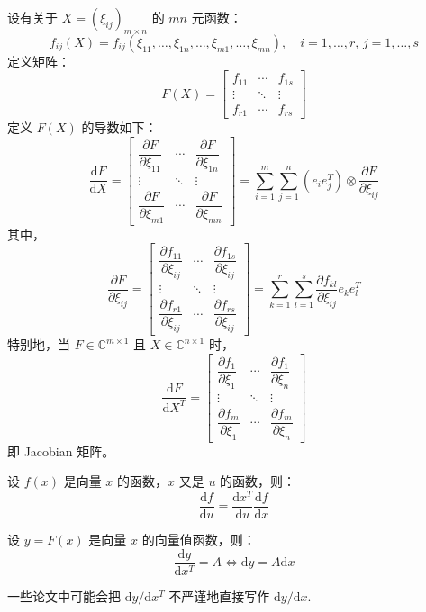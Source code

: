 \begin{definition}[矩阵函数对矩阵的导数]
设有关于 $X=(\xi_{ij})_{m\times n}$ 的 $mn$ 元函数：
\[
    f_{ij}(X)=f_{ij}(\xi_{11},\ldots,\xi_{1n},\ldots,\xi_{m1},\ldots,\xi_{mn}),\quad i=1,\ldots,r,\,j=1,\ldots,s
\]
定义矩阵：
\[
    F(X)=\begin{bmatrix}f_{11}&\cdots&f_{1s}\\\vdots&\ddots&\vdots\\f_{r1}&\cdots&f_{rs}\end{bmatrix}
\]
定义 $F(X)$ 的导数如下：
\[
    \frac{\mathrm dF}{\mathrm dX}=
    \begin{bmatrix}
    \dfrac{\partial F}{\partial \xi_{11}}&\cdots&\dfrac{\partial F}{\partial \xi_{1n}}\\
    \vdots&\ddots&\vdots\\
    \dfrac{\partial F}{\partial \xi_{m1}}&\cdots&\dfrac{\partial F}{\partial \xi_{mn}}
    \end{bmatrix}=\sum_{i=1}^m\sum_{j=1}^n(e_ie_j^T)\otimes\frac{\partial F}{\partial \xi_{ij}}
\]
其中，
\[
    \frac{\partial F}{\partial \xi_{ij}}=
    \begin{bmatrix}
    \dfrac{\partial f_{11}}{\partial \xi_{ij}}&\cdots&\dfrac{\partial f_{1s}}{\partial \xi_{ij}}\\
    \vdots&\ddots&\vdots\\
    \dfrac{\partial f_{r1}}{\partial \xi_{ij}}&\cdots&\dfrac{\partial f_{rs}}{\partial \xi_{ij}}
    \end{bmatrix}=\sum_{k=1}^r\sum_{l=1}^s\frac{\partial f_{kl}}{\partial \xi_{ij}}e_ke_l^T
\]
特别地，当 $F\in\mathbb C^{m\times 1}$ 且 $X\in\mathbb C^{n\times 1}$ 时，
\[
    \frac{\mathrm dF}{\mathrm dX^T}=
    \begin{bmatrix}
    \dfrac{\partial f_{1}}{\partial \xi_{1}}&\cdots&\dfrac{\partial f_{1}}{\partial \xi_{n}}\\
    \vdots&\ddots&\vdots\\
    \dfrac{\partial f_{m}}{\partial \xi_{1}}&\cdots&\dfrac{\partial f_{m}}{\partial \xi_{n}}
    \end{bmatrix}
\]
即 Jacobian 矩阵。
\end{definition}

\begin{property}[链式法则]
设 $f(x)$ 是向量 $x$ 的函数，$x$ 又是 $u$ 的函数，则：
\[
    \frac{\mathrm df}{\mathrm du}=\frac{\mathrm dx^T}{\mathrm du}\frac{\mathrm df}{\mathrm dx}
\]
\end{property}

\begin{theorem}[向量函数关于向量导数的微分形式]
设 $y=F(x)$ 是向量 $x$ 的向量值函数，则：
\[
    \frac{\mathrm dy}{\mathrm dx^T}=A\iff\mathrm dy=A\mathrm dx
\]
\end{theorem}
\begin{note}
一些论文中可能会把 $\mathrm dy/\mathrm dx^T$ 不严谨地直接写作 $\mathrm dy/\mathrm dx$.
\end{note}

